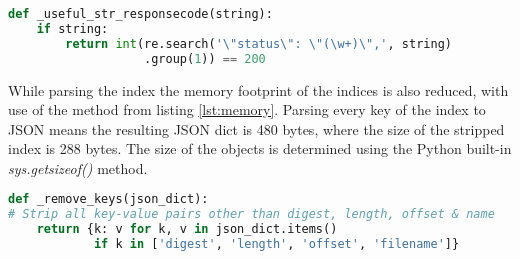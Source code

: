 \begin{lstlisting}[language=Python, caption=Regex solution]
def _useful_str_responsecode(string):
    if string:
        return int(re.search('\"status\": \"(\w+)\",', string)
                   .group(1)) == 200
\end{lstlisting}

While parsing the index the memory footprint of the indices is also reduced, with use of the method from listing \ref{lst:memory}. Parsing every key of the index to JSON means the resulting JSON dict is 480 bytes, where the size of the stripped index is 288 bytes. The size of the objects is determined using the Python built-in \textit{sys.getsizeof()} method. 

\begin{lstlisting}[language=Python, caption=Reducing memory footprint, label={lst:memory}]
def _remove_keys(json_dict):
# Strip all key-value pairs other than digest, length, offset & name
    return {k: v for k, v in json_dict.items()
            if k in ['digest', 'length', 'offset', 'filename']}
\end{lstlisting}
